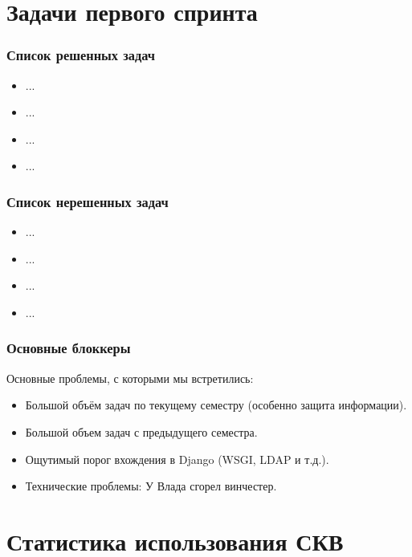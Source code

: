 \documentclass{beamer}
\begin{document}
\section{Задачи первого спринта}

\begin{frame}
\frametitle{Список решенных задач}

\begin{itemize}
\item ...
\item ...
\item ...
\item ...
\end{itemize}


\end{frame}


\begin{frame}
\frametitle{Список нерешенных задач}

\begin{itemize}
\item ...
\item ...
\item ...
\item ...
\end{itemize}


\end{frame}


\begin{frame}
\frametitle{Основные блоккеры}

Основные проблемы, с которыми мы встретились:
\begin{itemize}
\item Большой объём задач по текущему семестру (особенно защита информации).
\item Большой объем задач с предыдущего семестра.
\item Ощутимый порог вхождения в Django (WSGI, LDAP и т.д.).
\item Технические проблемы: У Влада сгорел винчестер.
\end{itemize}


\end{frame}

\section{Статистика использования СКВ}
\end{document}
